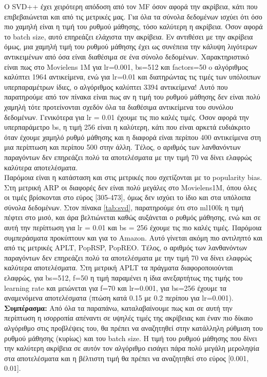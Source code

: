  \noindent Ο SVD++ έχει χειρότερη απόδοση από τον MF όσον αφορά την ακρίβεια, κάτι που επιβεβαιώνεται και από τις μετρικές μας. Για όλα τα σύνολα δεδομένων ισχύει ότι όσο πιο χαμηλή είναι η τιμή του ρυθμού μάθησης, τόσο καλύτερη η ακρίβεια. Όσον αφορά το batch size, αυτό επηρεάζει ελάχιστα την ακρίβεια.
 Εν αντιθέσει με την ακρίβεια όμως, μια χαμηλή τιμή του ρυθμού μάθησης έχει ως συνέπεια την κάλυψη λιγότερων αντικειμένων από όσα είναι διαθέσιμα σε ένα σύνολο δεδομένων. Χαρακτηριστικό είναι πως στο Movielens 1M για lr=0.001, bs=512 και factors=50 o αλγόριθμος καλύπτει 1964 αντικείμενα, ενώ για lr=0.01 και διατηρώντας τις τιμές των υπόλοιπων υπερπαραμέτρων ίδιες, ο αλγόριθμος καλύπτει 3394 αντικείμενα! Αυτό που παρατηρούμε από τον πίνακα είναι πως αν η τιμή του ρυθμού μάθησης δεν είναι πολύ χαμηλή τότε προτείνονται σχεδόν όλα τα διαθέσιμα αντικείμενα του συνόλου δεδομένων. Γενικότερα για lr = 0.01 έχουμε τις πιο καλές τιμές. Όσον αφορά την υπερπαράμετρο bs, η τιμή 256 είναι η καλύτερη, κάτι που είναι αρκετά ευδιάκριτο όταν έχουμε χαμηλό ρυθμό μάθησης και η διαφορά είναι περίπου 400 αντικείμενα στη μια περίπτωση και περίπου 500 στην άλλη. Τέλος, ο αριθμός των λανθανόντων παραγόντων δεν επηρεάζει πολύ τα αποτελέσματα με την τιμή 70 να δίνει ελαφρώς καλύτερα αποτελέσματα.\\
 Παρόμοια είναι η κατάσταση και στις μετρικές που σχετίζονται με το popularity bias. Στη μετρική ARP οι διαφορές δεν είναι πολύ μεγάλες στο Movielens1M, όπου όλες οι τιμές βρίσκονται στο εύρος [305-473], όμως δεν ισχύει το ίδιο και στα υπόλοιπα σύνολα δεδομένων. Στον πίνακα \ref{tab:svd}, παρατηρούμε ότι στο ml100k η τιμή πέφτει στο μισό, και άρα βελτιώνεται καθώς αυξάνεται ο ρυθμός μάθησης, ενώ και σε αυτή την περίπτωση για lr = 0.01 και bs = 256 έχουμε τις πιο καλές τιμές. Παρόμοια συμπεράσματα προκύπτουν και για το Amazon. Αυτό γίνεται ακόμη πιο αντιληπτό και από τις μετρικές APLT, PopRSP, PopREO. Τέλος, ο αριθμός των λανθανόντων παραγόντων δεν επηρεάζει πολύ τα αποτελέσματα με την τιμή 70 να δίνει ελαφρώς καλύτερα αποτελέσματα. Στη μετρική APLT τα πράγματα διαφοροποιούνται ελαφρώς, για bs=512, f=50 η τιμή παραμένει η ίδια ανεξαρτήτως της τιμής του learning rate και μειώνεται για f=70 και lr=0.001, για bs=256 έχουμε τα αναμενόμενα αποτελέσματα (πτώση κατά 0.15 με 0.2 περίπου για lr=0.001).\\
 \textbf{Συμπέρασμα:} Από όλα τα παραπάνω, καταλαβαίνουμε πως και σε αυτή την περίπτωση η ισορροπία απέναντι σε υψηλές τιμές της ακρίβειας και έναν πιο δίκαιο αλγόριθμο στις προβλέψεις του, θα πρέπει να αναζητηθεί στην κατάλληλη ρύθμιση του ρυθμού μάθησης (κυρίως) και του batch size. Η τιμή του ρυθμού μάθησης που δίνει την καλύτερη ακρίβεια σε αυτόν τον αλγόριθμο εισάγει πάρα πολύ μεγάλη μεροληψία στα αποτελέσματα και η βέλτιστη τιμή θα πρέπει να αναζητηθεί στο εύρος [0.001, 0.01].
